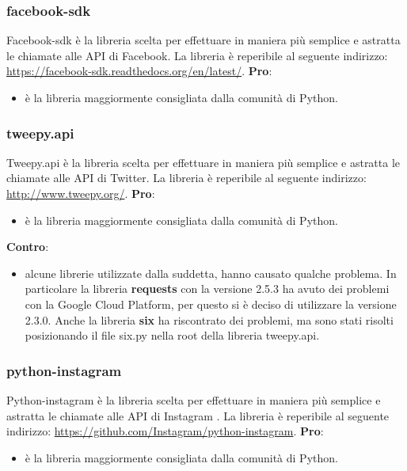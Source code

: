 		\subsubsection{facebook-sdk} %
		\label{ssub:facebook_sdk}
		Facebook-sdk è la libreria scelta per effettuare in maniera più semplice e astratta le chiamate alle API di Facebook. La libreria è reperibile al seguente indirizzo: \url{https://facebook-sdk.readthedocs.org/en/latest/}. \newline
		\textbf{Pro}:
			\begin{itemize}
				\item è la libreria maggiormente consigliata dalla comunità di Python.
			\end{itemize}


		\subsubsection{tweepy.api} %
		\label{ssub:tweetpy}
		Tweepy.api è la libreria scelta per effettuare in maniera più semplice e astratta le chiamate alle API di Twitter. La libreria è reperibile al seguente indirizzo: \url{http://www.tweepy.org/}. \newline
		\textbf{Pro}:
			\begin{itemize}
				\item è la libreria maggiormente consigliata dalla comunità di Python.
			\end{itemize}
		\noindent
		\textbf{Contro}:
			\begin{itemize}
				\item alcune librerie utilizzate dalla suddetta, hanno causato qualche problema. In particolare la libreria \textbf{requests} con la versione 2.5.3 ha avuto dei problemi con la Google Cloud Platform, per questo si è deciso di utilizzare la versione 2.3.0. Anche la libreria \textbf{six} ha riscontrato dei problemi, ma sono stati risolti posizionando il file six.py nella root della libreria tweepy.api.
			\end{itemize}
		\noindent

		\subsubsection{python-instagram} %
		\label{ssub:python_instagram}
		Python-instagram è la libreria scelta per effettuare in maniera più semplice e astratta le chiamate alle API di Instagram . La libreria è reperibile al seguente indirizzo: \url{https://github.com/Instagram/python-instagram}. \newline
		\textbf{Pro}:
			\begin{itemize}
				\item è la libreria maggiormente consigliata dalla comunità di Python.
			\end{itemize}
		\noindent

